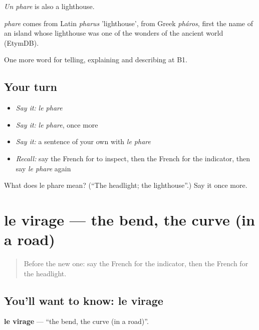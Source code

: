 \emph{Un phare} is also a lighthouse.

\begin{cousinweb}
\emph{phare} comes from Latin \emph{pharus} 'lighthouse', from Greek \emph{pháros}, first the name of an island whose lighthouse was one of the wonders of the ancient world (EtymDB).
\end{cousinweb}

\begin{grammarlens}[title={What you've built}]
One more word for telling, explaining and describing at B1.
\end{grammarlens}

\subsection*{Your turn}
\begin{itemize}
\raggedright
  \item \emph{Say it:} \emph{le phare}
  \item \emph{Say it:} \emph{le phare}, once more
  \item \emph{Say it:} a sentence of your own with \emph{le phare}
  \item \emph{Recall:} say the French for to inspect, then the French for the indicator, then say \emph{le phare} again
\end{itemize}

\begin{tcolorbox}[breakable,colback=teal!4,colframe=teal!35!black,title={Before you move on}]
What does le phare mean? (\textquotedblleft{}The headlight; the lighthouse\textquotedblright{}.) Say it once more.
\end{tcolorbox}
\section[le virage]{le virage — the bend, the curve (in a road)}

\label{lesson:FR-C409-virage}



\begin{quote}
Before the new one: say the French for the indicator, then the French for the headlight.
\end{quote}

\subsection*{You'll want to know: le virage}
\textbf{le virage} — \textquotedblleft{}the bend, the curve (in a road)\textquotedblright{}.

